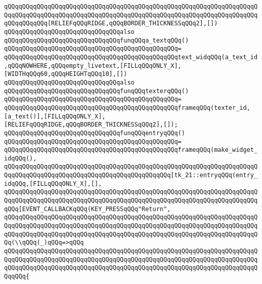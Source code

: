 \verb|qQQqqQQqqQQqqQQqqQQqqQQqqQQqqQQqqQQqqQQqqQQqqQQqqQQqqQQqqQQqqQQqqQQqqQQqqQQqqQQqqQQqqQQqqQQqqQQqqQQqqQQqqQQqqQQqqQQqqQQqqQQqqQQqqQQqqQQqqQQqqQQqqQQqqQQq[RELIEFqQQqRIDGE,qQQqBORDER_THICKNESSqQQq2],[])|\newline
\newline
\verb|qQQqqQQqqQQqqQQqqQQqqQQqqQQqqQQqalso|\newline
\verb|qQQqqQQqqQQqqQQqqQQqqQQqqQQqqQQqfunqQQqa_textqQQq()|\newline
\verb|qQQqqQQqqQQqqQQqqQQqqQQqqQQqqQQqqQQqqQQqqQQqqQQq=|\newline
\verb|qQQqqQQqqQQqqQQqqQQqqQQqqQQqqQQqqQQqqQQqqQQqqQQqtext_widqQQq(a_text_id,qQQqNOWHERE,qQQqempty_livetext,[FILLqQQqONLY_X],[WIDTHqQQq60,qQQqHEIGHTqQQq10],[])|\newline
\newline
\verb|qQQqqQQqqQQqqQQqqQQqqQQqqQQqqQQqalso|\newline
\verb|qQQqqQQqqQQqqQQqqQQqqQQqqQQqqQQqfunqQQqtexterqQQq()|\newline
\verb|qQQqqQQqqQQqqQQqqQQqqQQqqQQqqQQqqQQqqQQqqQQqqQQq=|\newline
\verb|qQQqqQQqqQQqqQQqqQQqqQQqqQQqqQQqqQQqqQQqqQQqqQQqframeqQQq(texter_id,[a_text()],[FILLqQQqONLY_X],[RELIEFqQQqRIDGE,qQQqBORDER_THICKNESSqQQq2],[]);|\newline
\newline
\verb|qQQqqQQqqQQqqQQqqQQqqQQqqQQqqQQqfunqQQqentryqQQq()|\newline
\verb|qQQqqQQqqQQqqQQqqQQqqQQqqQQqqQQqqQQqqQQqqQQqqQQq=|\newline
\verb|qQQqqQQqqQQqqQQqqQQqqQQqqQQqqQQqqQQqqQQqqQQqqQQqframeqQQq(make_widget_idqQQq(),|\newline
\verb|qQQqqQQqqQQqqQQqqQQqqQQqqQQqqQQqqQQqqQQqqQQqqQQqqQQqqQQqqQQqqQQqqQQqqQQqqQQqqQQqqQQqqQQqqQQqqQQqqQQqqQQqqQQqqQQqqQQq[tk_21::entryqQQq(entry_idqQQq,[FILLqQQqONLY_X],[],|\newline
\verb|qQQqqQQqqQQqqQQqqQQqqQQqqQQqqQQqqQQqqQQqqQQqqQQqqQQqqQQqqQQqqQQqqQQqqQQqqQQqqQQqqQQqqQQqqQQqqQQqqQQqqQQqqQQqqQQqqQQqqQQqqQQqqQQqqQQqqQQqqQQqqQQq[EVENT_CALLBACKqQQq(KEY_PRESSqQQq"Return",|\newline
\verb|qQQqqQQqqQQqqQQqqQQqqQQqqQQqqQQqqQQqqQQqqQQqqQQqqQQqqQQqqQQqqQQqqQQqqQQqqQQqqQQqqQQqqQQqqQQqqQQqqQQqqQQqqQQqqQQqqQQqqQQqqQQqqQQqqQQqqQQqqQQqqQQqqQQqqQQqqQQqqQQqqQQqqQQqqQQqqQQqqQQqqQQqqQQqqQQqqQQqqQQqqQQqqQQqqQQq(\\qQQq(_)qQQq=>qQQq|\newline
\verb|qQQqqQQqqQQqqQQqqQQqqQQqqQQqqQQqqQQqqQQqqQQqqQQqqQQqqQQqqQQqqQQqqQQqqQQqqQQqqQQqqQQqqQQqqQQqqQQqqQQqqQQqqQQqqQQqqQQqqQQqqQQqqQQqqQQqqQQqqQQqqQQqqQQqqQQqqQQqqQQqqQQqqQQqqQQqqQQqqQQqqQQqqQQqqQQqqQQqqQQqqQQqqQQqqQQqqQQq{|\newline

